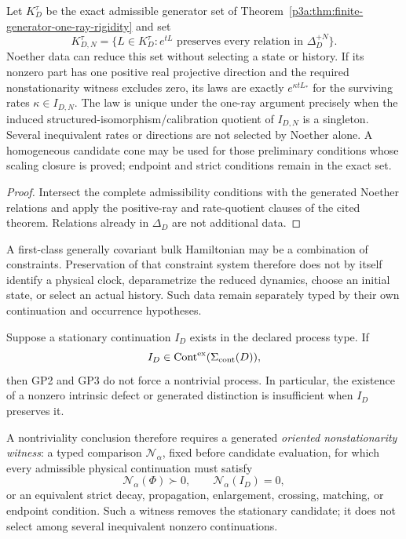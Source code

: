 \documentclass[12pt,a4paper]{article}
\begin{document}
\begin{corollary}
\label{p3a:cor:v176-noether-constrained-one-ray}
Let \(K_D^\tau\) be the exact admissible generator set of
Theorem~\ref{p3a:thm:finite-generator-one-ray-rigidity} and set
\[
 K_{D,N}^\tau=\{L\in K_D^\tau:
 e^{tL}\text{ preserves every relation in }\Delta_D^{+N}\}.
\]
Noether data can reduce this set without selecting a state or history.
If its nonzero part has one positive real projective direction and the
required nonstationarity witness excludes zero, its laws are exactly
\(e^{\kappa tL_*}\) for the surviving rates \(\kappa\in I_{D,N}\).
The law is unique under the one-ray argument precisely when the induced
structured-isomorphism/calibration quotient of \(I_{D,N}\) is a singleton.
Several inequivalent rates or directions are not selected by Noether alone.
A homogeneous candidate cone may be used for those preliminary conditions
whose scaling closure is proved; endpoint and strict conditions remain in
the exact set.
\end{corollary}
\begin{proof}
Intersect the complete admissibility conditions with the generated Noether
relations and apply the positive-ray and rate-quotient clauses of the cited
theorem. Relations already in \(\Delta_D\) are not additional data.
\end{proof}

\begin{remark}
\label{p3a:rem:v176-constraint-history-clock-firewall}
A first-class generally covariant bulk Hamiltonian may be a combination of
constraints.  Preservation of that constraint system therefore does not by
itself identify a physical clock, deparametrize the reduced dynamics, choose
an initial state, or select an actual history.  Such data remain separately
typed by their own continuation and occurrence hypotheses.
\end{remark}


\begin{corollary}
\label{p3a:cor:identity-survival-oriented-nonstationarity}
Suppose a stationary continuation \(I_D\) exists in the declared process type.
If
\[
 I_D\in\operatorname{Cont}^{\rm ex}(\Sigma_{\rm cont}(D)),
\]
then GP2 and GP3 do not force a nontrivial process.  In particular, the
existence of a nonzero intrinsic defect or generated distinction is
insufficient when \(I_D\) preserves it.

A nontriviality conclusion therefore requires a generated
\emph{oriented nonstationarity witness}: a typed comparison
\(\mathcal N_\alpha\), fixed before candidate evaluation, for which every
admissible physical continuation must satisfy
\[
 \mathcal N_\alpha(\Phi)\succ0,
 \qquad
 \mathcal N_\alpha(I_D)=0,
\]
or an equivalent strict decay, propagation, enlargement, crossing, matching,
or endpoint condition.  Such a witness removes the stationary candidate; it
does not select among several inequivalent nonzero continuations.
\end{corollary}
\end{document}
